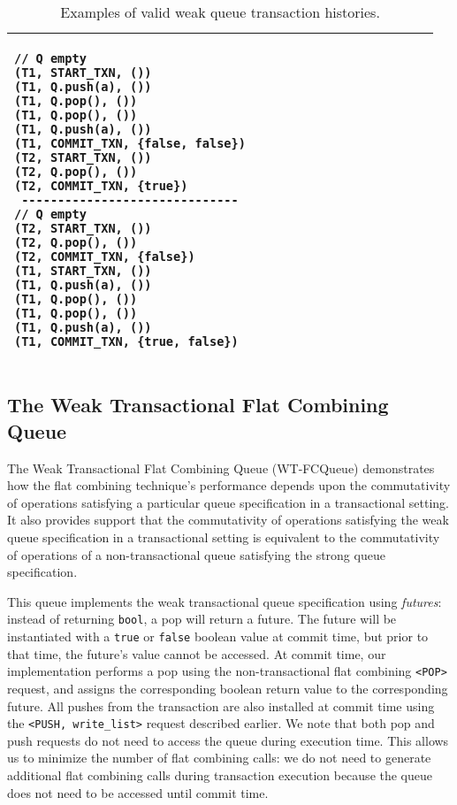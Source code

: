 \begin{table}[H]
\begin{tabular}{|l|l|}
\begin{lstlisting}
// Q empty
(T1, START_TXN, ())                       
(T1, Q.push(a), ())                       
(T1, Q.pop(), ())                       
(T1, Q.pop(), ())                       
(T1, Q.push(a), ())                       
(T1, COMMIT_TXN, {false, false})                       
(T2, START_TXN, ())                       
(T2, Q.pop(), ())                       
(T2, COMMIT_TXN, {true})                       
 ------------------------------
// Q empty
(T2, START_TXN, ())                       
(T2, Q.pop(), ())                       
(T2, COMMIT_TXN, {false})                       
(T1, START_TXN, ())                       
(T1, Q.push(a), ())                       
(T1, Q.pop(), ())                       
(T1, Q.pop(), ())                       
(T1, Q.push(a), ())                       
(T1, COMMIT_TXN, {true, false})                       
\end{lstlisting}\\
    \hline
    
    \end{tabular}
    \caption[Examples of valid weak queue transaction histories.]{Examples of valid weak queue transaction histories.}
    \label{tab:txnal_weakq_commute}
    \end{table}

\subsection{The Weak Transactional Flat Combining Queue}
The Weak Transactional Flat Combining Queue (WT-FCQueue) demonstrates how the flat combining technique's performance depends upon the commutativity of operations satisfying a particular queue specification in a transactional setting. It also provides support that the commutativity of operations satisfying the weak queue specification in a transactional setting is equivalent to the commutativity of operations of a non-transactional queue satisfying the strong queue specification.

This queue implements the weak transactional queue specification using \emph{futures}: instead of returning \texttt{bool}, a pop will return a future. The future will be instantiated with a \texttt{true} or \texttt{false} boolean value at commit time, but prior to that time, the future's value cannot be accessed.
At commit time, our implementation performs a pop using the non-transactional flat combining \texttt{<POP>} request, and assigns the corresponding boolean return value to the corresponding future. All pushes from the transaction are also installed at commit time using the \texttt{<PUSH, write\_list>} request described earlier. We note that both pop and push requests do not need to access the queue during execution time. This allows us to minimize the number of flat combining calls: we do not need to generate additional flat combining calls during transaction execution because the queue does not need to be accessed until commit time.


